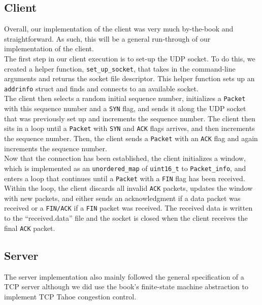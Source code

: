 \documentclass{article}
\begin{document}
\subsection{Client}

Overall, our implementation of the client was very much by-the-book and straightforward. As such, this will be a general run-through of our implementation of the client. \\

\noindent
The first step in our client execution is to set-up the UDP socket. To do this, we created a helper function, \texttt{set\_up\_socket}, that takes in the command-line arguments and returns the socket file descriptor. This helper function sets up an \texttt{addrinfo} struct and finds and connects to an available socket. \\

\noindent
The client then selects a random initial sequence number, initializes a \texttt{Packet} with this sequence number and a \texttt{SYN} flag, and sends it along the UDP socket that was previously set up and increments the sequence number. The client then sits in a loop until a \texttt{Packet} with \texttt{SYN} and \texttt{ACK} flags arrives, and then increments the sequence number. Then, the client sends a \texttt{Packet} with an \texttt{ACK} flag and again increments the sequence number. \\

\noindent
Now that the connection has been established, the client initializes a window, which is implemented as an \texttt{unordered\_map} of \texttt{uint16\_t} to \texttt{Packet\_info}, and enters a loop that continues until a \texttt{Packet} with a \texttt{FIN} flag has been received. Within the loop, the client discards all invalid \texttt{ACK} packets, updates the window with new packets, and either sends an acknowledgment if a data packet was received or a \texttt{FIN/ACK} if a \texttt{FIN} packet was received. The received data is written to the ``received.data'' file and the socket is closed when the client receives the final \texttt{ACK} packet.

\subsection{Server}

The server implementation also mainly followed the general specification of a TCP server although we did use the book's finite-state machine abstraction to implement TCP Tahoe congestion control. \\
\end{document}
